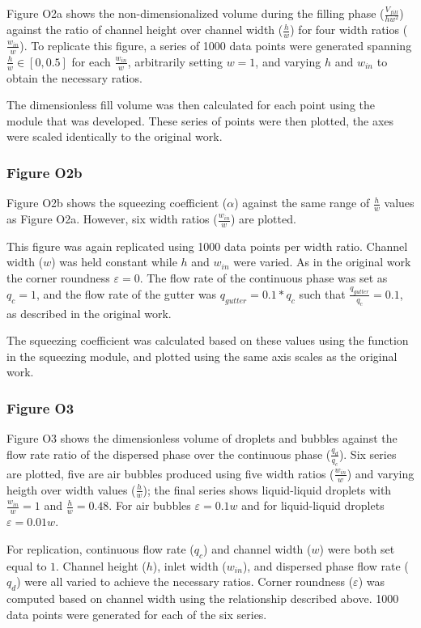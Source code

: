 Figure O2a shows the non-dimensionalized volume during the filling phase ($\frac{V_{fill}}{hw^2}$)
against the ratio of channel height over channel width ($\frac{h}{w}$) for four width ratios 
($\frac{w_{in}}{w}$).
To replicate this figure, a series of 1000 data points were generated spanning $\frac{h}{w} \in [0,0.5]$
for each $\frac{w_{in}}{w}$, arbitrarily setting $w=1$, and varying $h$ and
$w_{in}$ to obtain the necessary ratios.

The dimensionless fill volume was then calculated for each point using the module that was
developed. These series of points were then plotted, the axes were scaled identically to the
original work.

\subsubsection{Figure O2b}

Figure O2b shows the squeezing coefficient ($\alpha$) against the same range of $\frac{h}{w}$
values as Figure O2a. However, six width ratios ($\frac{w_{in}}{w}$) are plotted.

This figure was again replicated using 1000 data points per width ratio. Channel width ($w$) was
held constant while $h$ and $w_{in}$ were varied. As in the original work the corner roundness
$\varepsilon=0$. The flow rate of the continuous phase was set as $q_c=1$, and the flow rate of the
gutter was $q_{gutter}=0.1*q_c$ such that $\frac{q_{gutter}}{q_c}=0.1$, as described in the original
work.

The squeezing coefficient was calculated based on these values using the function in the
squeezing module, and plotted using the same axis scales as the original work.

\subsubsection{Figure O3}

Figure O3 shows the dimensionless volume of droplets and bubbles against the flow rate ratio
of the dispersed phase over the continuous phase ($\frac{q_d}{q_c}$). Six series are plotted,
five are air bubbles produced using five width ratios ($\frac{w_{in}}{w}$) and varying heigth over width
values ($\frac{h}{w}$); the final series shows liquid-liquid droplets with $\frac{w_{in}}{w} = 1$ and
$\frac{h}{w}=0.48$. For air bubbles $\varepsilon=0.1w$ and for liquid-liquid droplets $\varepsilon=0.01w$.

For replication, continuous flow rate ($q_c$) and channel width ($w$) were both set equal to $1$.
Channel height ($h$), inlet width ($w_{in}$), and dispersed phase flow rate ($q_d$) were all varied to
achieve the necessary ratios. Corner roundness ($\varepsilon$) was computed based on channel width using the
relationship described above. 1000 data points were generated for each of the six series.

